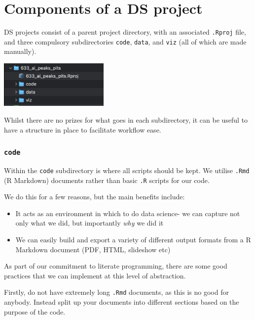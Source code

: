 \documentclass[
  letterpaper,
  DIV=11,
  numbers=noendperiod]{scrreprt}
\providecommand{\tightlist}{%
  \setlength{\itemsep}{0pt}\setlength{\parskip}{0pt}}\usepackage{longtable,booktabs,array}
\begin{document}
\section{Components of a DS project}\label{components-of-a-ds-project}

DS projects consist of a parent project directory, with an associated
\texttt{.Rproj} file, and three compulsory subdirectories \texttt{code},
\texttt{data}, and \texttt{viz} (all of which are made manually).

\begin{center}
\includegraphics[width=0.4\textwidth,height=\textheight]{./img/project_directory.png}
\end{center}

Whilst there are no prizes for what goes in each subdirectory, it can be
useful to have a structure in place to facilitate workflow ease.

\subsubsection{\texorpdfstring{\texttt{code}}{code}}\label{code}

Within the \texttt{code} subdirectory is where all scripts should be
kept. We utilise \texttt{.Rmd} (R Markdown) documents rather than basic
\texttt{.R} scripts for our code.

We do this for a few reasons, but the main benefits include:

\begin{itemize}
\tightlist
\item
  It acts as an environment in which to do data science- we can capture
  not only what we did, but importantly \emph{why} we did it
\item
  We can easily build and export a variety of different output formats
  from a R Markdown document (PDF, HTML, slideshow etc)
\end{itemize}

As part of our commitment to literate programming, there are some good
practices that we can implement at this level of abstraction.

Firstly, do not have extremely long \texttt{.Rmd} documents, as this is
no good for anybody. Instead split up your documents into different
sections based on the purpose of the code.
\end{document}
